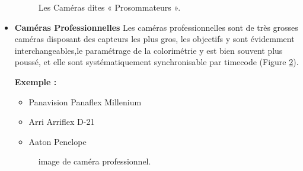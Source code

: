 \begin{itemize}
  \begin{figure}[H]%
  	\center%
  	\setlength{\fboxsep}{5pt}%
  	\setlength{\fboxrule}{0.5pt}%
  \caption[Les Caméras dites « Prosommateurs »]{Les Caméras dites « Prosommateurs ».}
  \label{fig:Les Caméras dites « Prosommateurs »}
  \end{figure}
  
 	\item \textbf{Caméras Professionnelles} Les caméras professionnelles sont de très grosses caméras disposant des capteurs les plus gros, les objectifs y sont évidemment interchangeables,le paramétrage de la colorimétrie y est bien souvent plus poussé, et elle sont systématiquement synchronisable par timecode (Figure \ref{fig:Caméras professionnel}).
 	
 	\textbf{Exemple :}
 	
 	\begin{itemize}
 		\item Panavision Panaflex Millenium
 		\item Arri Arriflex D-21
 		\item Aaton Penelope
 	\end{itemize}
 	
 	
 	\begin{figure}[H]%
 		\center%
 		\setlength{\fboxsep}{5pt}%
 		\setlength{\fboxrule}{0.5pt}%
 	\caption[Caméras professionnel]{image de caméra  professionnel.}
 	\label{fig:Caméras professionnel}
 	\end{figure}
 	

\end{itemize}

